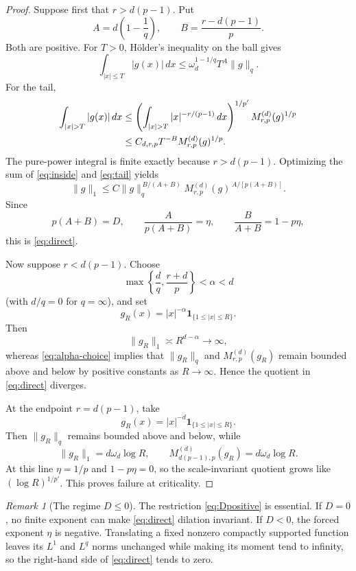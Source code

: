 \documentclass[11pt]{amsart}
\theoremstyle{remark}
\newtheorem{remark}[theorem]{Remark}
\newcommand{\norm}[1]{\lVert #1\rVert}
\newcommand{\ind}{\mathbf 1}
\newcommand{\Mrp}{M_{r,p}^{(d)}}
\renewcommand{\Mc}{M_{d(p-1),p}^{(d)}}
\begin{document}
\begin{proof}
Suppose first that $r>d(p-1)$.  Put
\[
 A=d\left(1-\frac1q\right),
 \qquad
 B=\frac{r-d(p-1)}{p}.
\]
Both are positive.  For $T>0$, H\"older's inequality on the ball gives
\begin{equation}\label{eq:inside}
 \int_{|x|\le T}|g(x)|\,dx
 \le \omega_d^{1-1/q}T^A\norm{g}_q.
\end{equation}
For the tail,
\begin{align}
 \int_{|x|>T}|g(x)|\,dx
 &\le
 \left(\int_{|x|>T}|x|^{-r/(p-1)}\,dx\right)^{1/p'}
 \Mrp(g)^{1/p}\notag\\
 &\le C_{d,r,p}T^{-B}\Mrp(g)^{1/p}.
 \label{eq:tail}
\end{align}
The pure-power integral is finite exactly because $r>d(p-1)$.  Optimizing
the sum of \eqref{eq:inside} and \eqref{eq:tail} yields
\[
 \norm{g}_1
 \le C\norm{g}_q^{\,B/(A+B)}
       \Mrp(g)^{\,A/[p(A+B)]}.
\]
Since
\[
 p(A+B)=D,
 \qquad
 \frac{A}{p(A+B)}=\eta,
 \qquad
 \frac{B}{A+B}=1-p\eta,
\]
this is \eqref{eq:direct}.

Now suppose $r<d(p-1)$.  Choose
\begin{equation}\label{eq:alpha-choice}
 \max\left\{\frac dq,\frac{r+d}{p}\right\}<\alpha<d
\end{equation}
(with $d/q=0$ for $q=\infty$), and set
\[
 g_R(x)=|x|^{-\alpha}\ind_{\{1\le |x|\le R\}}.
\]
Then
\[
 \norm{g_R}_1\asymp R^{d-\alpha}\longrightarrow\infty,
\]
whereas \eqref{eq:alpha-choice} implies that $\norm{g_R}_q$ and
$\Mrp(g_R)$ remain bounded above and below by positive constants as
$R\to\infty$.  Hence the quotient in \eqref{eq:direct} diverges.

At the endpoint $r=d(p-1)$, take
\begin{equation}\label{eq:endpoint-power}
 g_R(x)=|x|^{-d}\ind_{\{1\le |x|\le R\}}.
\end{equation}
Then $\norm{g_R}_q$ remains bounded above and below, while
\begin{equation}\label{eq:endpoint-logs}
 \norm{g_R}_1=d\omega_d\log R,
 \qquad
 \Mc(g_R)=d\omega_d\log R.
\end{equation}
At this line $\eta=1/p$ and $1-p\eta=0$, so the scale-invariant quotient
grows like $(\log R)^{1/p'}$.  This proves failure at criticality.
\end{proof}

\begin{remark}[The regime $D\le0$]\label{rem:D}
The restriction \eqref{eq:Dpositive} is essential.  If $D=0$, no finite
exponent can make \eqref{eq:direct} dilation invariant.  If $D<0$, the
forced exponent $\eta$ is negative.  Translating a fixed nonzero compactly
supported function leaves its $L^1$ and $L^q$ norms unchanged while making
its moment tend to infinity, so the right-hand side of \eqref{eq:direct}
tends to zero.
\end{remark}
\end{document}
